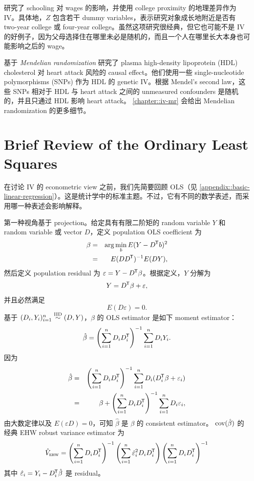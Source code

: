 \begin{example}\label{example::Card1993}
\citet{card1993using} 研究了 schooling 对 wages 的影响，并使用 college proximity 的地理差异作为 IV。具体地，$Z$ 包含若干 dummy variables，表示研究对象成长地附近是否有 two-year college 或 four-year college。虽然这项研究很经典，但它也可能不是 IV 的好例子，因为父母选择住在哪里未必是随机的，而且一个人在哪里长大本身也可能影响之后的 wage。 
\end{example}



\begin{example}
\citet{voight2012plasma} 基于 {\it Mendelian randomization} 研究了 plasma high-density lipoprotein (HDL) cholesterol 对 heart attack 风险的 causal effect。他们使用一些 single-nucleotide polymorphisms (SNPs) 作为 HDL 的 genetic IV。根据 Mendel's second law，这些 SNPs 相对于 HDL 与 heart attack 之间的 unmeasured confounders 是随机的，并且只通过 HDL 影响 heart attack。 
\cref{chapter::iv-mr} 会给出 Mendelian randomization 的更多细节。 
\end{example}



\section{Brief Review of the Ordinary Least Squares}



在讨论 IV 的 econometric view 之前，我们先简要回顾 OLS（见 \cref{appendix::basic-linear-regression}）。这是统计学中的标准主题。不过，它有不同的数学表述，而采用哪一种表述会影响解释。 

第一种视角基于 projection。给定具有有限二阶矩的 random variable $Y$ 和 random variable 或 vector $D$，定义 population OLS coefficient 为
\begin{eqnarray*}
\beta  &=& \arg\min_b E(Y - D  ^{\mkern-1.5mu\mathsf{T}} b  )^2 \\
&=& E(DD^{\mkern-1.5mu\mathsf{T}})^{-1} E(DY),
\end{eqnarray*}
然后定义 population residual 为 $\varepsilon = Y -  D  ^{\mkern-1.5mu\mathsf{T}} \beta $。根据定义，$Y$ 分解为
\begin{eqnarray}\label{eq::olsdecomposition}
Y = D  ^{\mkern-1.5mu\mathsf{T}} \beta  + \varepsilon,
\end{eqnarray}
并且必然满足
$$
E(  D \varepsilon) = 0.
$$ 
基于 $(D_i,Y_i)_{i=1}^n \stackrel{\textup{IID}}{\sim} (D, Y)$，$\beta$ 的 OLS estimator 是如下 moment estimator：
$$
\hat{\beta} = \left(  \sum_{i=1}^n D_i D_i^{\mkern-1.5mu\mathsf{T}} \right)^{-1}   \sum_{i=1}^n D_i Y_i  . 
$$
因为
\begin{eqnarray*}
\hat{\beta}  &=& \left(  \sum_{i=1}^n D_i D_i^{\mkern-1.5mu\mathsf{T}} \right)^{-1}  \sum_{i=1}^n D_i ( D_i^{\mkern-1.5mu\mathsf{T}} \beta + \varepsilon_i   )  \\
&=& \beta + \left(  \sum_{i=1}^n D_i D_i^{\mkern-1.5mu\mathsf{T}} \right)^{-1} \sum_{i=1}^n D_i  \varepsilon_i   ,
\end{eqnarray*}
由大数定律以及 $E(\varepsilon D) = 0$，可知 $\hat{\beta}$ 是 $\beta$ 的 consistent estimator。
$\textup{cov}(\hat\beta)$ 的经典 EHW robust variance estimator 为
$$
\hat{V}_\textsc{ehw} = \left(  \sum_{i=1}^n D_i D_i^{\mkern-1.5mu\mathsf{T}} \right)^{-1}
\left(  \sum_{i=1}^n \hat{\varepsilon}_i^2 D_i D_i^{\mkern-1.5mu\mathsf{T}} \right)
\left(  \sum_{i=1}^n D_i D_i^{\mkern-1.5mu\mathsf{T}} \right)^{-1}
$$
其中 $\hat{\varepsilon}_i  = Y_i - D_i^{\mkern-1.5mu\mathsf{T}} \hat{\beta}$ 是 residual。 




